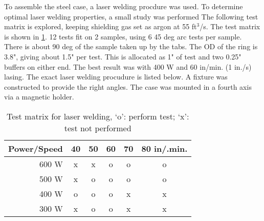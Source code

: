 \label{app:laser}

To assemble the steel case, a laser welding procdure was used.
To determine optimal laser welding properties, a small study was performed
The following test matrix is explored, keeping shielding gas set as argon at 55 ft$^3$/s.
The test matrix is shown in \ref{tab:lasers}.
12 tests fit on 2 samples, using 6 45 deg arc tests per sample. 
There is about 90 deg of the sample taken up by the tabs.
The OD of the ring is 3.8", giving about 1.5" per test. 
This is allocated as 1" of test and two 0.25" buffers on either end.
The best result was with 400 W and 60 in/min. (1 in./s) lasing.
The exact laser welding procudure is listed below. A fixture was constructed to provide the right angles.
The case was mounted in a fourth axis via a magnetic holder.

\begin{table}[]
\centering
\caption{Test matrix for laser welding, `o': perform test; `x': test not performed}
\label{tab:lasers}
\begin{tabular}{|r|c|c|c|c|c|}
\hline
Power/Speed  &40   &50   &60   &70  &80 in/.min. \\ \hline
      600 W   &x    &x    &o    &o   &o \\ \hline
      500 W   &x    &o    &o    &o   &o \\ \hline
      400 W   &o    &o    &o    &x   &x \\ \hline
      300 W   &x    &o    &o    &x   &x \\ \hline
\end{tabular}
\end{table}

